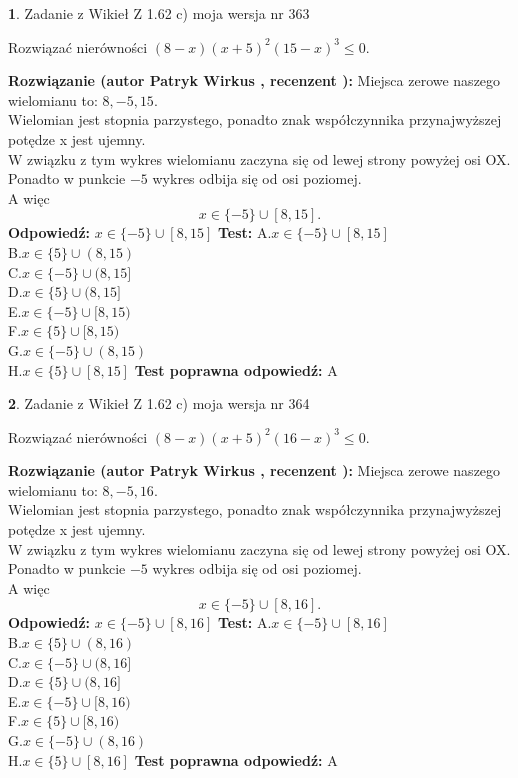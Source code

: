 \documentclass[12pt, a4paper]{article}
\theoremstyle{definition} %
\newtheorem{zad}{}
\newcommand{\zadStart}[1]{\begin{zad}#1\newline}
\newcommand{\zadStop}{\end{zad}}
\newcommand{\rozwStart}[2]{\noindent \textbf{Rozwiązanie (autor #1 , recenzent #2): }\newline}
\newcommand{\rozwStop}{\newline}
\newcommand{\odpStart}{\noindent \textbf{Odpowiedź:}\newline}
\newcommand{\odpStop}{\newline}
\newcommand{\testStart}{\noindent \textbf{Test:}\newline}
\newcommand{\testStop}{\newline}
\newcommand{\kluczStart}{\noindent \textbf{Test poprawna odpowiedź:}\newline}
\newcommand{\kluczStop}{\newline}
\begin{document}
\zadStart{Zadanie z Wikieł Z 1.62 c) moja wersja nr 363}

Rozwiązać nierówności $(8-x)(x+5)^{2}(15-x)^{3}\le0$.
\zadStop
\rozwStart{Patryk Wirkus}{}
Miejsca zerowe naszego wielomianu to: $8, -5, 15$.\\
Wielomian jest stopnia parzystego, ponadto znak współczynnika przy\linebreak najwyższej potędze x jest ujemny.\\ W związku z tym wykres wielomianu zaczyna się od lewej strony powyżej osi OX.\\
Ponadto w punkcie $-5$ wykres odbija się od osi poziomej.\\
A więc $$x \in \{-5\} \cup [8,15].$$
\rozwStop
\odpStart
$x \in \{-5\} \cup [8,15]$
\odpStop
\testStart
A.$x \in \{-5\} \cup [8,15]$\\
B.$x \in \{5\} \cup (8,15)$\\
C.$x \in \{-5\} \cup (8,15]$\\
D.$x \in \{5\} \cup (8,15]$\\
E.$x \in \{-5\} \cup [8,15)$\\
F.$x \in \{5\} \cup [8,15)$\\
G.$x \in \{-5\} \cup (8,15)$\\
H.$x \in \{5\} \cup [8,15]$
\testStop
\kluczStart
A
\kluczStop



\zadStart{Zadanie z Wikieł Z 1.62 c) moja wersja nr 364}

Rozwiązać nierówności $(8-x)(x+5)^{2}(16-x)^{3}\le0$.
\zadStop
\rozwStart{Patryk Wirkus}{}
Miejsca zerowe naszego wielomianu to: $8, -5, 16$.\\
Wielomian jest stopnia parzystego, ponadto znak współczynnika przy\linebreak najwyższej potędze x jest ujemny.\\ W związku z tym wykres wielomianu zaczyna się od lewej strony powyżej osi OX.\\
Ponadto w punkcie $-5$ wykres odbija się od osi poziomej.\\
A więc $$x \in \{-5\} \cup [8,16].$$
\rozwStop
\odpStart
$x \in \{-5\} \cup [8,16]$
\odpStop
\testStart
A.$x \in \{-5\} \cup [8,16]$\\
B.$x \in \{5\} \cup (8,16)$\\
C.$x \in \{-5\} \cup (8,16]$\\
D.$x \in \{5\} \cup (8,16]$\\
E.$x \in \{-5\} \cup [8,16)$\\
F.$x \in \{5\} \cup [8,16)$\\
G.$x \in \{-5\} \cup (8,16)$\\
H.$x \in \{5\} \cup [8,16]$
\testStop
\kluczStart
A
\kluczStop
\end{document}
